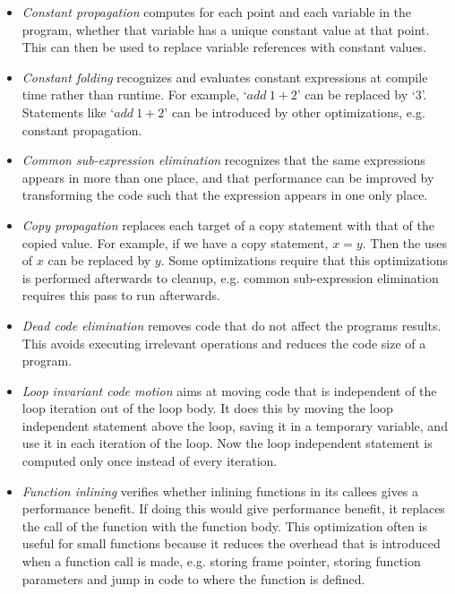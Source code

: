\begin{itemize}
\item \emph{Constant propagation} computes for each point and each variable in the program, whether that variable has a unique constant value at that point. This can then be used to replace variable references with constant values.
\item \emph{Constant folding} recognizes and evaluates constant expressions at compile time rather than runtime. For example, `$add\ 1+2$' can be replaced by `$3$'. Statements like `$add\ 1+2$' can be introduced by other optimizations, e.g. constant propagation. 
\item \emph{Common sub-expression elimination} recognizes that the same expressions appears in more than one place, and that performance can be improved by transforming the code such that the expression appears in one only place.
\item \emph{Copy propagation} replaces each target of a copy statement with that of the copied value. For example, if we have a copy statement, $x = y$. Then the uses of $x$ can be replaced by $y$. Some optimizations require that this optimizations is performed afterwards to cleanup, e.g. common sub-expression elimination requires this pass to run afterwards. 
\item \emph{Dead code elimination} removes code that do not affect the programs results. This avoids executing irrelevant operations and reduces the code size of a program.  
\item \emph{Loop invariant code motion} aims at moving code that is independent of the loop iteration out of the loop body. It does this by moving the loop independent statement above the loop, saving it in a temporary variable, and use it in each iteration of the loop. Now the loop independent statement is computed only once instead of every iteration. 
\item \emph{Function inlining} verifies whether inlining functions in its callees gives a performance benefit. If doing this would give performance benefit, it replaces the call of the function with the function body. This optimization often is useful for small functions because it reduces the overhead that is introduced when a function call is made, e.g. storing frame pointer, storing function parameters and jump in code to where the function is defined.     
\end{itemize}

